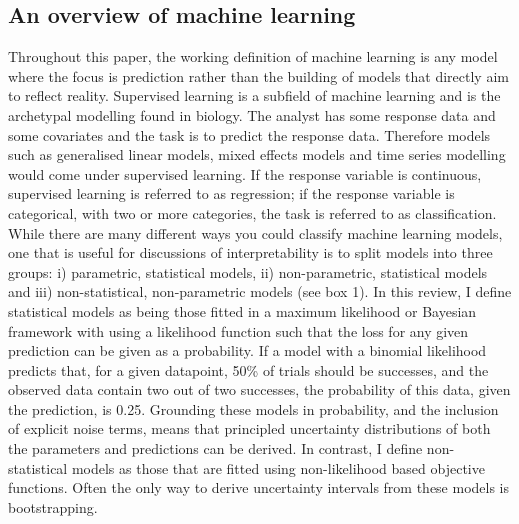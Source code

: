 \documentclass[12pt]{article}
\begin{document}
\subsection{An overview of machine learning}\label{an-overview-of-machine-learning}

Throughout this paper, the working definition of machine learning is any model where the focus is prediction rather than the building of models that directly aim to reflect reality.
Supervised learning is a subfield of machine learning and is the archetypal modelling found in biology.
The analyst has some response data and some covariates and the task is to predict the response data.
Therefore models such as generalised linear models, mixed effects models and time series modelling would come under supervised learning.
If the response variable is continuous, supervised learning is referred to as regression; if the response  variable is categorical, with two or more categories, the task is referred to as classification.
While there are many different ways you could classify machine learning models, one that is useful for discussions of interpretability is to split models into three groups: i) parametric, statistical models, ii) non-parametric, statistical models and iii) non-statistical, non-parametric models (see box 1).
In this review, I define statistical models as being those fitted in a maximum likelihood or Bayesian framework with using a likelihood function such that the loss for any given prediction can be given as a probability.
If a model with a binomial likelihood predicts that, for a  given datapoint, 50\% of trials should be successes, and the observed data contain two out of two successes, the probability of this data, given the prediction, is 0.25.
Grounding these models in probability, and the inclusion of explicit noise terms, means that principled uncertainty distributions of both the parameters and predictions can be derived.
In contrast, I define non-statistical models as those that are fitted using non-likelihood based objective functions.
Often the only way to derive uncertainty intervals from these models is bootstrapping.
\end{document}
